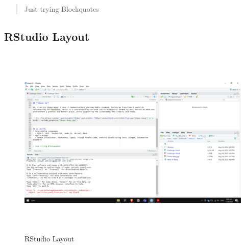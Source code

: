 \documentclass[
]{article}
\begin{document}
\begin{quote}
Just trying Blockquotes
\end{quote}

\hypertarget{rstudio-layout}{%
\subsection{RStudio Layout}\label{rstudio-layout}}

\begin{figure}

{\centering \includegraphics[width=500px,height=350px]{RStudio Layout} 

}

\caption{RStudio Layout }\label{fig:unnamed-chunk-2}
\end{figure}
\end{document}
